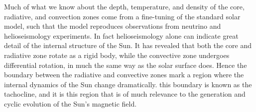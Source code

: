 Much of what we know about the depth, temperature, and density of the core, radiative, and convection zones come from a fine-tuning of the standard solar model, such that the model reproduces observations from neutrino and helioseismology experiments. In fact helioseismology alone can indicate great detail of the internal structure of the Sun. It has revealed that both the core and radiative zone rotate as a rigid body, while the convective zone undergoes differential rotation, in much the same way as the solar surface does. Hence the boundary between the radiative and convective zones mark a region where the internal dynamics of the Sun change dramatically. this boundary is known as the tachocline, and it is this region that is of much relevance to the generation and cyclic evolution of the Sun's magnetic field.




